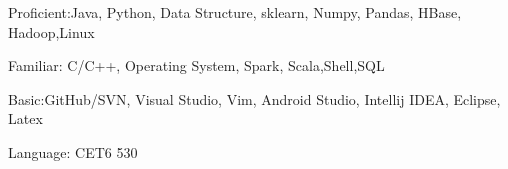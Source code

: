 \vspace{-20pt}
\begin{cventries}
  \cventry
    {}
    {}
    {}
    {}
    {
      \begin{cvitems}
      \vspace{-20pt}
        \item {Proficient:Java, Python, Data Structure, sklearn, Numpy, Pandas, HBase, Hadoop,Linux}
        \item{Familiar: C/C++, Operating System, Spark, Scala,Shell,SQL}
        \item{Basic:GitHub/SVN, Visual Studio, Vim, Android Studio, Intellij IDEA, Eclipse, Latex}
        \item{Language: CET6 530}
      \end{cvitems}
    }
\end{cventries}
